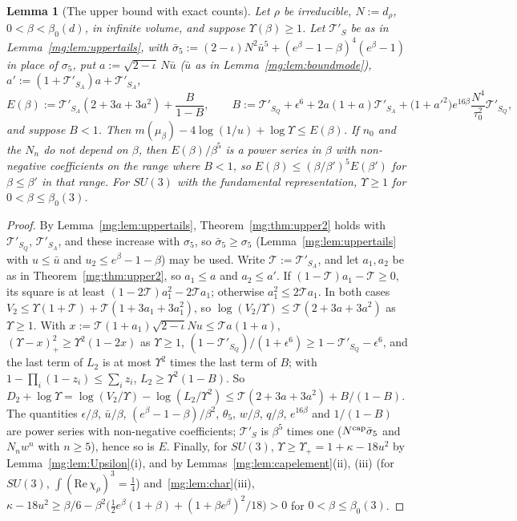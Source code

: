 \documentclass[11pt,a4paper]{article}
\newtheorem{lemma}[theorem]{Lemma}
\theoremstyle{definition}
\theoremstyle{remark}
\begin{document}
\begin{lemma}[The upper bound with exact counts]\label{mg:lem:upperE}
Let $\rho$ be irreducible, $N:=d_\rho$, $0<\beta<\beta_0(d)$, in infinite volume, and suppose $\Upsilon(\beta)\ge1$. Let $\mathcal T'_S$ be as in Lemma~\ref{mg:lem:uppertails}, with $\bar\sigma_5:=
(2-\iota)N^2\bar u^5+(e^\beta-1-\beta)^4(e^\beta-1)$ in place of $\sigma_5$, put $a:=\sqrt{2-\iota}\,N\bar u$ ($\bar u$ as in Lemma~\ref{mg:lem:boundmode}), $a':=(1+\mathcal T'_{S_A})a+\mathcal T'_{S_A}$,
\[
E(\beta):=\mathcal T'_{S_A}(2+3a+3a^2)+\frac B{1-B},\qquad B:=\mathcal T'_{S_Q}+\epsilon^6+2a(1+a)\mathcal T'_{S_A}+\bigl(1+a'^2\bigr)e^{16\beta}\frac{N^4}{\tau_0^2}\mathcal T'_{S_Q},
\]
and suppose $B<1$. Then $m(\mu_\beta)-4\log(1/u)+\log\Upsilon\le E(\beta)$. If $n_0$ and the $N_n$ do not depend on $\beta$, then $E(\beta)/\beta^5$ is a power series in $\beta$ with
non-negative coefficients on the range where $B<1$, so $E(\beta)\le(\beta/\beta')^5E(\beta')$ for $\beta\le\beta'$ in that range. For $SU(3)$ with the fundamental representation,
$\Upsilon\ge1$ for $0<\beta\le\beta_0(3)$.
\end{lemma}

\begin{proof}
By Lemma~\ref{mg:lem:uppertails}, Theorem~\ref{mg:thm:upper2} holds with $\mathcal T'_{S_Q}$, $\mathcal T'_{S_A}$, and these increase with $\sigma_5$, so $\bar\sigma_5\ge\sigma_5$ (Lemma~\ref{mg:lem:uppertails}
with $u\le\bar u$ and $u_2\le e^\beta-1-\beta$) may be used. Write $\mathcal T:=\mathcal T'_{S_A}$, and let $a_1,a_2$ be as in Theorem~\ref{mg:thm:upper2}, so $a_1\le a$ and $a_2\le a'$. If
$(1-\mathcal T)a_1-\mathcal T\ge0$, its square is at least $(1-2\mathcal T)a_1^2-2\mathcal Ta_1$; otherwise $a_1^2\le2\mathcal Ta_1$. In both cases
$V_2\le\Upsilon(1+\mathcal T)+\mathcal T(1+3a_1+3a_1^2)$, so $\log(V_2/\Upsilon)\le\mathcal T(2+3a+3a^2)$ as $\Upsilon\ge1$. With $x:=\mathcal T(1+a_1)\sqrt{2-\iota}Nu\le\mathcal Ta(1+a)$,
$(\Upsilon-x)_+^2\ge\Upsilon^2(1-2x)$ as $\Upsilon\ge1$, $(1-\mathcal T'_{S_Q})/(1+\epsilon^6)\ge1-\mathcal T'_{S_Q}-\epsilon^6$, and the last term of $L_2$ is at most $\Upsilon^2$ times the last term of $B$; with
$1-\prod_i(1-z_i)\le\sum_iz_i$, $L_2\ge\Upsilon^2(1-B)$. So $D_2+\log\Upsilon=\log(V_2/\Upsilon)-\log(L_2/\Upsilon^2)\le\mathcal T(2+3a+3a^2)+B/(1-B)$. The quantities $\epsilon/\beta$, $\bar u/\beta$,
$(e^\beta-1-\beta)/\beta^2$, $\theta_5$, $w/\beta$, $q/\beta$, $e^{16\beta}$ and $1/(1-B)$ are power series with non-negative coefficients; $\mathcal T'_S$ is $\beta^5$ times one ($N^{\rm cap}\bar\sigma_5$ and
$N_nw^n$ with $n\ge5$), hence so is $E$. Finally, for $SU(3)$, $\Upsilon\ge\Upsilon_+=1+\kappa-18u^2$ by Lemma~\ref{mg:lem:Upsilon}(i), and by Lemmas~\ref{mg:lem:capelement}(ii), (iii) (for
$SU(3)$, $\int(\mathrm{Re}\,\chi_\rho)^3=\frac14$) and~\ref{mg:lem:char}(iii), $\kappa-18u^2\ge\beta/6-\beta^2\bigl(\frac12e^\beta(1+\beta)+(1+\beta e^\beta)^2/18\bigr)>0$ for $0<\beta\le\beta_0(3)$.
\end{proof}
\end{document}
